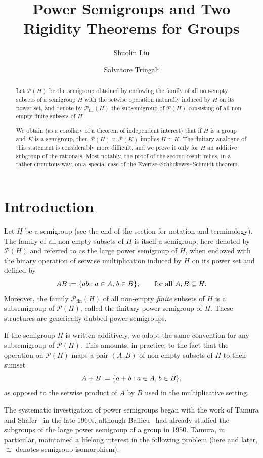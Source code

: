 \documentclass[11pt,reqno]{amsart}
\title[Power Semigroups and Two Rigidity Theorems for Groups]
{Power Semigroups and Two Rigidity Theorems for Groups}
\author{Shuolin Liu}
\author{Salvatore Tringali}
\theoremstyle{definition}
\theoremstyle{remark}
\theoremstyle{theoremdd}
\newcommand{\Pfin}{\mathcal P_{\mathrm{fin}}}
\newcommand{\evid}[1]{\textsf{#1}}
\renewcommand{\,}{\kern 0.1em}
\begin{document}
\begin{abstract}
Let $\mathcal P(H)$ be the semigroup obtained by endowing the family of all non-empty subsets of a semigroup $H$ with the setwise operation naturally induced by $H$ on its power set, and denote by $\mathcal P_\text{fin}(H)$ the subsemigroup of $\mathcal P(H)$ consisting of all non-empty finite subsets of $H$.

We obtain (as a corollary of a theorem of independent interest) that if $H$ is a group and $K$ is a semigroup, then $\mathcal P(H) \cong \mathcal P(K)$ implies $H \cong K$. The finitary analogue of this statement is considerably more difficult, and we prove it only for $H$ an additive subgroup of the rationals. 
Most notably, the proof of the second result relies, in a rather circuitous way, on a special case of the Evertse--Schlickewei--Schmidt theorem.
\end{abstract}
\maketitle

\section{Introduction}
\label{sect:1}
Let $H$ be a semigroup (see the end of the section for notation and terminology). The family of all non-empty subsets of $H$ is itself a semigroup, here denoted by $\mathcal P(H)$ and referred to as the 
\evid{large power semigroup} of $H$, when endowed with the binary operation of 
setwise multiplication induced by $H$ on its power set and defined by 
\[
AB := \{ab: a \in A,\, b \in B\}, \qquad\text{for all } A, B \subseteq H.
\]
Moreover, the family $\Pfin(H)$ of all non-empty \textit{finite} subsets of $H$ is a subsemigroup of $\mathcal P(H)$, called the \evid{finitary power semigroup} of $H$. These structures are generically dubbed \evid{power semigroups}.

If the semigroup $H$ is written additively, we adopt the same convention for any subsemigroup of $\mathcal P(H)$. This amounts, in practice, to the fact that the operation on
$\mathcal P(H)$ maps a pair $(A, B)$ of non-empty subsets of $H$ to their \evid{sumset}
\[
A + B := \{a + b: a \in A,\, b \in B\},
\]
as opposed to the setwise product of $A$ by $B$ used in the multiplicative setting.

The systematic investigation of power semigroups began with the work of Tamura and Shafer~\cite{Tam-Sha-1967} in the late 1960s, although Bailieu~\cite{bal-1950} had already studied the subgroups of the large power semigroup of a group in 1950. Tamura, in particular, maintained a lifelong interest in the following problem (here and later, $\cong$ denotes semigroup isomorphism).
\end{document}
